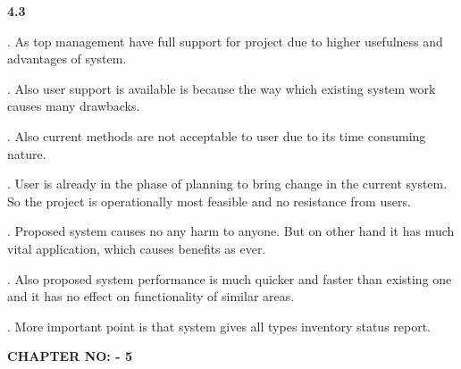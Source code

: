 \documentclass{article} %
\begin{document}
\noindent 

\noindent \textbf{4.3  }

. As top management have full support for project due to higher usefulness and advantages of system. 

\noindent 

. Also user support is available is because the way which existing system work causes many drawbacks. 

\noindent 

. Also current methods are not acceptable to user due to its time consuming nature. 

\noindent 

. User is already in the phase of planning to bring change in the current system. So the project is operationally most feasible and no resistance from users. 

\noindent 

. Proposed system causes no any harm to anyone. But on other hand it has much vital application, which causes benefits as ever. 

\noindent 

. Also proposed system performance is much quicker and faster than existing one and it has no effect on functionality of similar areas. 

\noindent 

. More important point is that system gives all types inventory status report.

\noindent 

\noindent 

\noindent 

\noindent 

\noindent 

\noindent 

\noindent 

\noindent 

\noindent 

\noindent 

\noindent 

\noindent 

\noindent 

\noindent \textbf{                                                CHAPTER NO: - 5 }

\noindent \textbf{                            }\underbar{}

\noindent \textbf{}\underbar{}
\end{document}

